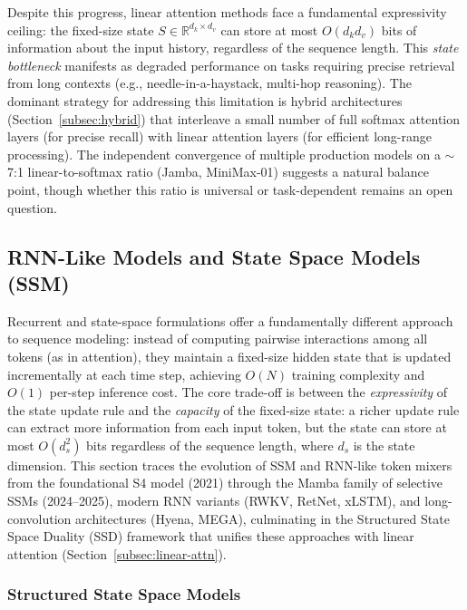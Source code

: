 Despite this progress, linear attention methods face a fundamental expressivity ceiling: the fixed-size state $S \in \mathbb{R}^{d_k \times d_v}$ can store at most $O(d_k d_v)$ bits of information about the input history, regardless of the sequence length. This \emph{state bottleneck} manifests as degraded performance on tasks requiring precise retrieval from long contexts (e.g., needle-in-a-haystack, multi-hop reasoning). The dominant strategy for addressing this limitation is hybrid architectures (Section~\ref{subsec:hybrid}) that interleave a small number of full softmax attention layers (for precise recall) with linear attention layers (for efficient long-range processing). The independent convergence of multiple production models on a ${\sim}$7:1 linear-to-softmax ratio (Jamba, MiniMax-01) suggests a natural balance point, though whether this ratio is universal or task-dependent remains an open question.


\subsection{RNN-Like Models and State Space Models (SSM)}
\label{subsec:ssm}

Recurrent and state-space formulations offer a fundamentally different approach to sequence modeling: instead of computing pairwise interactions among all tokens (as in attention), they maintain a fixed-size hidden state that is updated incrementally at each time step, achieving $O(N)$ training complexity and $O(1)$ per-step inference cost. The core trade-off is between the \emph{expressivity} of the state update rule and the \emph{capacity} of the fixed-size state: a richer update rule can extract more information from each input token, but the state can store at most $O(d_s^2)$ bits regardless of the sequence length, where $d_s$ is the state dimension. This section traces the evolution of SSM and RNN-like token mixers from the foundational S4 model (2021) through the Mamba family of selective SSMs (2024--2025), modern RNN variants (RWKV, RetNet, xLSTM), and long-convolution architectures (Hyena, MEGA), culminating in the Structured State Space Duality (SSD) framework that unifies these approaches with linear attention (Section~\ref{subsec:linear-attn}).

\subsubsection{Structured State Space Models}
\label{subsubsec:s4}

